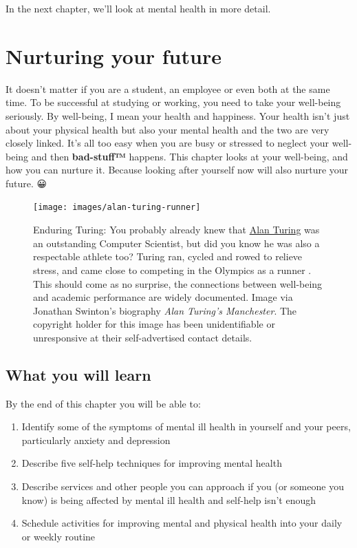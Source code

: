 \documentclass[
]{book}
\providecommand{\tightlist}{%
  \setlength{\itemsep}{0pt}\setlength{\parskip}{0pt}}
\begin{document}
In the next chapter, we'll look at mental health in more detail.

\hypertarget{nurturing}{%
\chapter{Nurturing your future}\label{nurturing}}

It doesn't matter if you are a student, an employee or even both at the same time. To be successful at studying or working, you need to take your well-being seriously. By well-being, I mean your health and happiness. Your health isn't just about your physical health but also your mental health and the two are very closely linked. It's all too easy when you are busy or stressed to neglect your well-being and then \textbf{bad-stuff™} happens. This chapter looks at your well-being, and how you can nurture it. Because looking after yourself now will also nurture your future. 😀

\begin{figure}

{\centering \texttt{[image: images/alan-turing-runner]} 

}

\caption{Enduring Turing: You probably already knew that \href{https://en.wikipedia.org/wiki/Alan_Turing}{Alan Turing} was an outstanding Computer Scientist, but did you know he was also a respectable athlete too? Turing ran, cycled and rowed to relieve stress, and came close to competing in the Olympics as a runner \citep{kottke}. This should come as no surprise, the connections between well-being and academic performance are widely documented. Image via Jonathan Swinton's biography \emph{Alan Turing's Manchester}. \citep{manturing} The copyright holder for this image has been unidentifiable or unresponsive at their self-advertised contact details.}\label{fig:turing-fig}
\end{figure}



\hypertarget{ilo3}{%
\section{What you will learn}\label{ilo3}}

By the end of this chapter you will be able to:

\begin{enumerate}
\def\labelenumi{\arabic{enumi}.}
\tightlist
\item
  Identify some of the symptoms of mental ill health in yourself and your peers, particularly anxiety and depression
\item
  Describe five self-help techniques for improving mental health
\item
  Describe services and other people you can approach if you (or someone you know) is being affected by mental ill health and self-help isn't enough
\item
  Schedule activities for improving mental and physical health into your daily or weekly routine
\end{enumerate}
\end{document}
